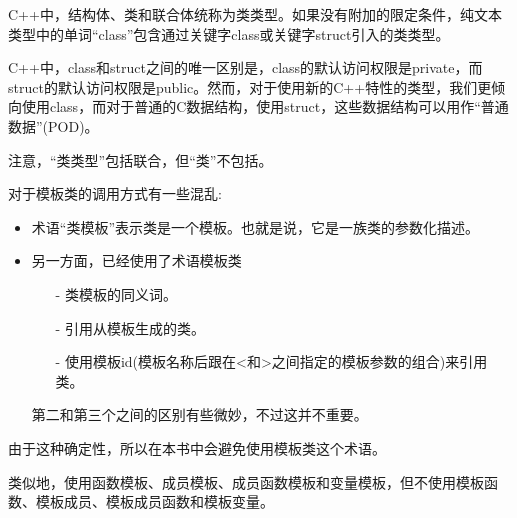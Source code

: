 C++中，结构体、类和联合体统称为类类型。如果没有附加的限定条件，纯文本类型中的单词“class”包含通过关键字class或关键字struct引入的类类型。

\begin{tcolorbox}[colback=webgreen!5!white,colframe=webgreen!75!black]
\hspace*{0.75cm}C++中，class和struct之间的唯一区别是，class的默认访问权限是private，而struct的默认访问权限是public。然而，对于使用新的C++特性的类型，我们更倾向使用class，而对于普通的C数据结构，使用struct，这些数据结构可以用作“普通数据”(POD)。
\end{tcolorbox}

注意，“类类型”包括联合，但“类”不包括。

对于模板类的调用方式有一些混乱:

\begin{itemize}
\item 
术语“类模板”表示类是一个模板。也就是说，它是一族类的参数化描述。

\item 
另一方面，已经使用了术语模板类
\begin{itemize}
\item[-]
类模板的同义词。

\item[-]
引用从模板生成的类。

\item[-]
使用模板id(模板名称后跟在<和>之间指定的模板参数的组合)来引用类。
\end{itemize}

第二和第三个之间的区别有些微妙，不过这并不重要。
\end{itemize}

由于这种确定性，所以在本书中会避免使用模板类这个术语。

类似地，使用函数模板、成员模板、成员函数模板和变量模板，但不使用模板函数、模板成员、模板成员函数和模板变量。

















